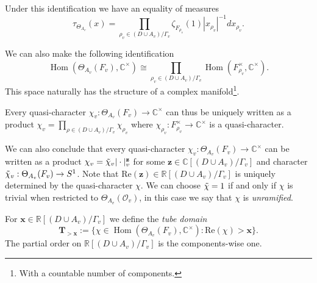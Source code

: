 \documentclass[a4paper,11pt,reqno]{amsart}
\newcommand{\R}{\mathbb{R}}
\newcommand{\C}{\mathbb{C}}
\DeclareMathOperator{\Hom}{Hom}
\renewcommand{\Re}{\mathrm{Re}}
\theoremstyle{definition}
\begin{document}
Under this identification we have an equality of measures 
\begin{equation}
	\tau_{\Theta_{A_v}}(x) = \prod_{\rho_v \in (D \cup A_v) / \Gamma_v} \zeta_{F_{\rho_v}}(1) |x_{\rho_v}|^{-1} dx_{\rho_v}.
	\label{Haar measure on the universal torsor torus}
\end{equation}

We can also make the following identification
\begin{equation*}
	\Hom(\Theta_{A_v}(F_v), \C^{\times}) \cong \prod_{\rho_v \in (D \cup A_v) / \Gamma_v} \Hom(F^{\times}_{\rho_v}, \C^{\times}).
\end{equation*}
This space naturally has the structure of a complex manifold\footnote{With a countable number of components.}.

Every quasi-character $\chi_v: \Theta_{A_v}(F_v) \to \C^{\times}$ can thus be uniquely written as a product $\chi_{v} = \prod_{\rho \in (D \cup A_v) / \Gamma_v} \chi_{\rho_v}$ where $\chi_{\rho_v}: F_{\rho_v}^{\times} \to \C^{\times}$ is a quasi-character.
	
We can also conclude that every quasi-character $\chi_v: \Theta_{A_v}(F_v) \to \C^{\times}$ can be written as a product $\chi_v = \Tilde{\chi}_v |\cdot|_v^{\mathbf{z}}$ for some $\mathbf{z} \in \C[(D \cup A_v) / \Gamma_v]$ and character $ \Tilde{\chi}_v: \Theta_{A_v}(F_v) \to S^1$. Note that $\Re(\mathbf{z}) \in \R[(D \cup A_v) / \Gamma_v]$ is uniquely determined by the quasi-character $\chi$. We can choose $\Tilde{\chi} = 1$ if and only if $\chi$ is trivial when restricted to $\Theta_{A_v}(\mathcal{O}_v)$, in this case we say that $\chi$ is \emph{unramified}.

For $\mathbf{x} \in \R[(D \cup A_v) / \Gamma_v]$ we define the \emph{tube domain}
\begin{equation*}
	\mathbf{T}_{> \mathbf{x}} := \{\chi \in \Hom(\Theta_{A_v}(F_v), \C^{\times}) : \Re(\chi) > \mathbf{x}\}.
\end{equation*}
The partial order on $\R[(D \cup A_v) / \Gamma_v]$ is the components-wise one.
\end{document}

